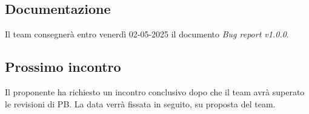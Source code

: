 \subsection{Documentazione}
Il team consegnerà entro venerdì 02-05-2025 il documento \textit{Bug report v1.0.0}.

\subsection{Prossimo incontro}
Il proponente ha richiesto un incontro conclusivo dopo che il team avrà
superato le revisioni di PB. La data verrà fissata in seguito, su proposta del
team.